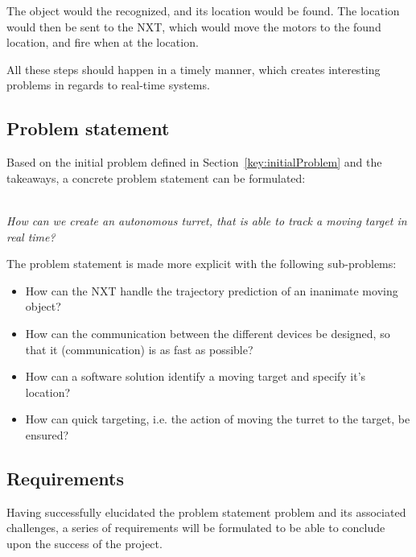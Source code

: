 
The object would the recognized, and its location would be found.
The location would then be sent to the NXT, which would move the motors to the found location, and fire when at the location.


All these steps should happen in a timely manner, which creates interesting problems in regards to real-time systems.

\subsection{Problem statement}
Based on the initial problem defined in Section~\ref{key:initialProblem} and the takeaways, a concrete problem statement can be formulated:\\~\\

\begin{center}
	\textit{\large{How can we create an autonomous turret, that is able to track a moving target in real time?}}
\end{center}

The problem statement is made more explicit with the following sub-problems:
\begin{center}
	\begin{itemize}
		\item How can the NXT handle the trajectory prediction of an inanimate moving object?
		\item How can the communication between the different devices be designed, so that it (communication) is as fast as possible?
		\item How can a software solution identify a moving target and specify it's location?
		\item How can quick targeting, i.e. the action of moving the turret to the target, be ensured?
	\end{itemize}
\end{center}

\subsection{Requirements}\label{subsec:requirements}
Having successfully elucidated the problem statement problem and its associated challenges, a series  of requirements will be formulated to be able to conclude upon the success of the project.

